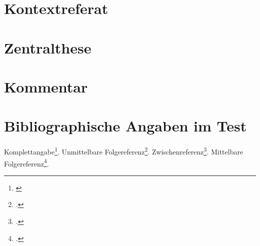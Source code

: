 %
%
%
%


%



\section{Kontextreferat}
\section{Zentralthese}
\section{Kommentar}

\section{Bibliographische Angaben im Test}

Komplettangabe\footnote{\cite[cf.][S.1]{Spielkamp2008a}}.
Unmittelbare Folgereferenz\footcite[cf.][S.2]{Spielkamp2008a}.
Zwischenreferenz\footcite[cf.][S.3]{DjoGehGraKreSpi2008a}.
Mittelbare Folgereferenz\footcite[cf.][S.4]{Spielkamp2008a}.


